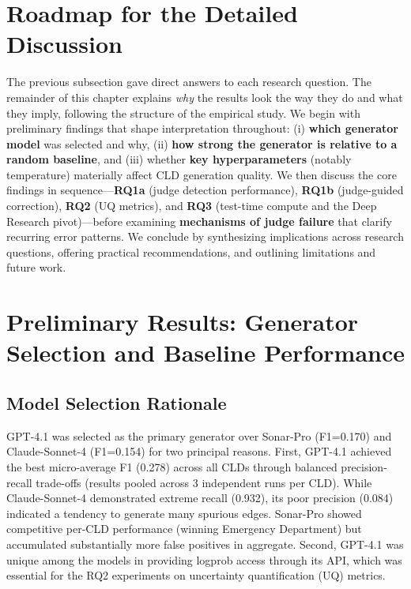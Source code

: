 \section{Roadmap for the Detailed Discussion}
\label{sec:discussion_positioning_preliminaries}
The previous subsection gave direct answers to each research question. The remainder of this chapter explains \textit{why} the results look the way they do and what they imply, following the structure of the empirical study. We begin with preliminary findings that shape interpretation throughout: (i) \textbf{which generator model} was selected and why, (ii) \textbf{how strong the generator is relative to a random baseline}, and (iii) whether \textbf{key hyperparameters} (notably temperature) materially affect CLD generation quality. We then discuss the core findings in sequence---\textbf{RQ1a} (judge detection performance), \textbf{RQ1b} (judge-guided correction), \textbf{RQ2} (UQ metrics), and \textbf{RQ3} (test-time compute and the Deep Research pivot)---before examining \textbf{mechanisms of judge failure} that clarify recurring error patterns. We conclude by synthesizing implications across research questions, offering practical recommendations, and outlining limitations and future work.

\section{Preliminary Results: Generator Selection and Baseline Performance}
\label{sec:discussion_preliminaries}

\subsection{Model Selection Rationale}

GPT-4.1 was selected as the primary generator over Sonar-Pro (F1=0.170) and Claude-Sonnet-4 (F1=0.154) for two principal reasons. First, GPT-4.1 achieved the best micro-average F1 (0.278) across all CLDs through balanced precision-recall trade-offs (results pooled across 3 independent runs per CLD). While Claude-Sonnet-4 demonstrated extreme recall (0.932), its poor precision (0.084) indicated a tendency to generate many spurious edges. Sonar-Pro showed competitive per-CLD performance (winning Emergency Department) but accumulated substantially more false positives in aggregate. Second, GPT-4.1 was unique among the models in providing logprob access through its API, which was essential for the RQ2 experiments on uncertainty quantification (UQ) metrics.

